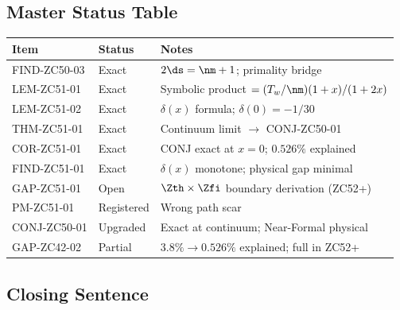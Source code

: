 \documentclass[12pt, a4paper]{article}
\begin{document}
\subsection{Master Status Table}

\begin{center}
\begin{tabular}{@{}lp{4.2cm}p{5cm}@{}}
\toprule
\textbf{Item} & \textbf{Status} & \textbf{Notes} \\
\midrule
FIND-ZC50-03 & Exact & $2\ds=\nm+1$; primality bridge \\
LEM-ZC51-01  & Exact & Symbolic product $=(T_w/\nm)(1+x)/(1+2x)$ \\
LEM-ZC51-02  & Exact & $\delta(x)$ formula; $\delta(0)=-1/30$ \\
THM-ZC51-01  & Exact & Continuum limit $\to$ CONJ-ZC50-01 \\
COR-ZC51-01  & Exact & CONJ exact at $x=0$; $0.526\%$ explained \\
FIND-ZC51-01 & Exact & $\delta(x)$ monotone; physical gap minimal \\
GAP-ZC51-01  & Open  & $\Zth\times\Zfi$ boundary derivation (ZC52+) \\
PM-ZC51-01   & Registered & Wrong path scar \\
\midrule
CONJ-ZC50-01 & Upgraded & Exact at continuum; Near-Formal physical \\
GAP-ZC42-02  & Partial & $3.8\%\to0.526\%$ explained; full in ZC52+ \\
\bottomrule
\end{tabular}
\end{center}

\subsection{Closing Sentence}
\end{document}
